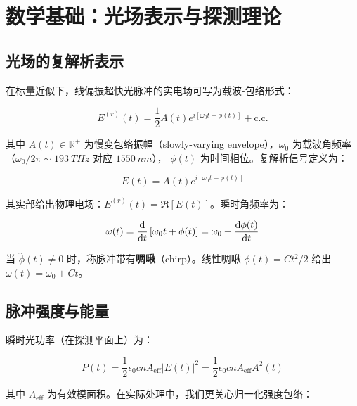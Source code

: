 \documentclass[11pt,a4paper]{article}
\begin{document}
\section{数学基础：光场表示与探测理论}

\subsection{光场的复解析表示}

在标量近似下，线偏振超快光脉冲的实电场可写为载波-包络形式\cite{Diels2006}：

\begin{equation}\label{eq:real_field}
E^{(r)}(t) = \frac{1}{2} A(t) e^{i[\omega_0 t + \phi(t)]} + \text{c.c.}
\end{equation}

其中 $A(t) \in \mathbb{R}^+$ 为慢变包络振幅（slowly-varying envelope），$\omega_0$ 为载波角频率（$\omega_0/2\pi \sim \SI{193}{THz}$ 对应 $\SI{1550}{nm}$），
$\phi(t)$ 为时间相位。复解析信号定义为：

\begin{equation}\label{eq:complex_field}
E(t) = A(t) e^{i[\omega_0 t + \phi(t)]}
\end{equation}

其实部给出物理电场：$E^{(r)}(t) = \Re[E(t)]$。瞬时角频率为：

\begin{equation}\label{eq:instant_freq}
\omega(t) = \dv{t} \left[ \omega_0 t + \phi(t) \right] = \omega_0 + \dv{\phi(t)}{t}
\end{equation}

当 $\dddot{\phi}(t) \neq 0$ 时，称脉冲带有\textbf{啁啾}（chirp）。线性啁啾 $\phi(t) = C t^2/2$ 给出 $\omega(t) = \omega_0 + C t$。

\subsection{脉冲强度与能量}

瞬时光功率（在探测平面上）为：

\begin{equation}\label{eq:instant_power}
P(t) = \frac{1}{2} \epsilon_0 c n A_{\text{eff}} |E(t)|^2 = \frac{1}{2} \epsilon_0 c n A_{\text{eff}} A^2(t)
\end{equation}

其中 $A_{\text{eff}}$ 为有效模面积。在实际处理中，我们更关心归一化强度包络：
\end{document}
